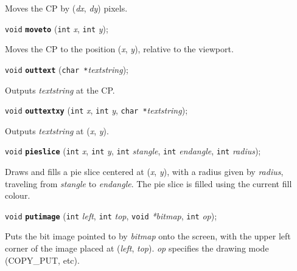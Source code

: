 \documentclass[a4paper,12pt]{article}
\newcommand{\V}{\texttt{void}}      %
\newcommand{\I}{\texttt{int}}       %
\newcommand{\C}{\texttt{char *}}    %
\newcommand{\func}[1]{\textbf{\texttt{#1}}}  %
\newcommand{\A}[1]{\emph{#1}}       %
\newenvironment{bgi}
{ %
  \begin{snugshade}
}
{ %
  \end{snugshade}
}
\begin{document}
Moves the CP by (\A{dx}, \A{dy}) pixels.


\label{sec:moveto}

\begin{bgi}
\V{} \func{moveto} (\I{} \A{x}, \I{} \A{y});
\end{bgi}

Moves the CP to the position (\A{x}, \A{y}), relative to the
viewport.


\label{sec:outtext}

\begin{bgi}
\V{} \func{outtext} (\C{}\A{textstring});
\end{bgi}

Outputs \A{textstring} at the CP.


\label{sec:outtextxy}

\begin{bgi}
\V{} \func{outtextxy} (\I{} \A{x}, \I{} \A{y}, \C{}\A{textstring});
\end{bgi}

Outputs \A{textstring} at (\A{x}, \A{y}).


\label{sec:pieslice}

\begin{bgi}
\V{} \func{pieslice} (\I{} \A{x}, \I{} \A{y}, \I{} \A{stangle}, \I{}
\A{endangle}, \I{} \A{radius});
\end{bgi}

Draws and fills a pie slice centered at (\A{x}, \A{y}), with a radius
given by \A{radius}, traveling from \A{stangle} to \A{endangle}. The
pie slice is filled using the current fill colour.


\label{sec:putimage}

\begin{bgi}
\V{} \func{putimage} (\I{} \A{left}, \I{} \A{top}, \V{} \A{*bitmap},
\I{} \A{op});
\end{bgi}

Puts the bit image pointed to by \A{bitmap} onto the screen, with the
upper left corner of the image placed at (\A{left}, \A{top}). \A{op}
specifies the drawing mode (COPY\_PUT, etc).
\end{document}
